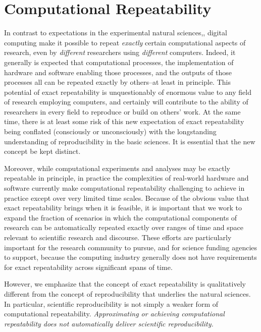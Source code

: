 \section{Computational Repeatability}

In contrast to expectations in the experimental natural sciences,, digital computing make it 
	possible to repeat \emph{exactly} certain computational aspects of research, even by \emph{different} 
	researchers using \emph{different} computers.  
Indeed, it generally is expected that computational processes, the implementation of hardware and software 
	enabling those processes, and the outputs of those processes all can be repeated exactly by others--at least in principle.
This potential of exact repeatability is unquestionably of enormous value to any field of research employing computers,
	and certainly will contribute to the ability of researchers in every field to reproduce or build on others' work.
At the same time, there is at least some risk of this new expectation of exact repeatability being conflated 
	(consciously or unconsciously) with the longstanding understanding of reproducibility in the basic sciences. 
It is essential that the new concept be kept distinct.

Moreover, while computational experiments and analyses may be exactly repeatable in principle, 
	in practice the complexities of real-world hardware and software currently make computational repeatability 
	challenging to achieve in practice except over very limited time scales.
Because of the obvious value that exact repeatability brings when it is feasible, it is important that we work to
	expand the fraction of scenarios in which the computational components of research can be automatically 
	repeated exactly over ranges of time and space relevant to scientific research and discourse.
These efforts are particularly important for the research community to pursue, and for science funding
	agencies to support, because the computing industry generally does not have requirements for exact 
	repeatability across significant spans of time.

However, we emphasize that the concept of exact repeatability is 
	qualitatively different from the concept of reproducibility that underlies the natural sciences.
In particular, scientific reproducibility is not simply a weaker form of computational repeatability.  
\emph{Approximating or achieving computational repeatability does not automatically deliver scientific reproducibility.}

